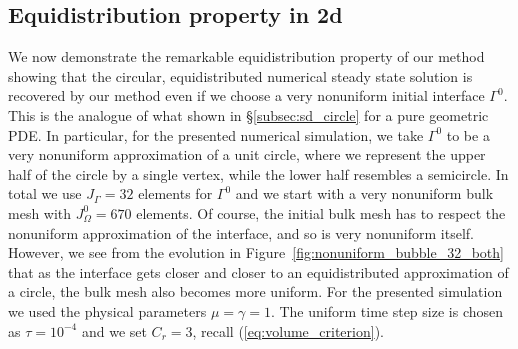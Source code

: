 \subsection{Equidistribution property in 2d}
We now demonstrate the remarkable equidistribution property of our method
showing that the circular, equidistributed numerical steady state solution is
recovered by our method even if we choose a very nonuniform initial interface
$\Gamma^0$. This is the analogue of what shown in \S\ref{subsec:sd_circle}
for a pure geometric PDE. In particular, for the presented numerical
simulation, we take $\Gamma^0$ to be a very nonuniform approximation of a unit
circle, where we represent the upper half of the circle by a single vertex,
while the lower half resembles a semicircle. In total we use $J_\Gamma = 32$
elements for $\Gamma^0$ and we start with a very nonuniform bulk mesh with
$J_\Omega^0 = 670$ elements. Of course, the initial bulk mesh has to respect
the nonuniform approximation of the interface, and so is very nonuniform
itself. However, we see from the evolution in
Figure~\ref{fig:nonuniform_bubble_32_both} that as the interface gets closer
and closer to an equidistributed approximation of a circle, the bulk mesh also
becomes more uniform. For the presented simulation we used the physical
parameters $\mu= \gamma=1$. The uniform time step size is chosen as
$\tau=10^{-4}$ and we set $C_r=3$, recall (\ref{eq:volume_criterion}).
